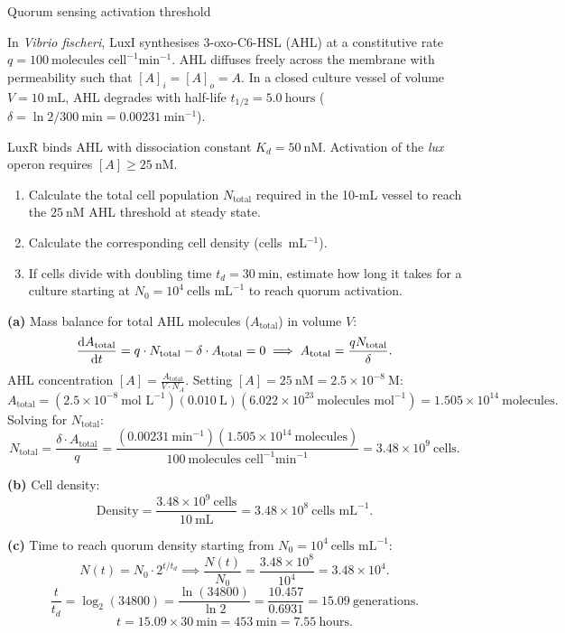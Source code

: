 \documentclass[12pt, a4paper, oneside]{report}
\begin{document}
\begin{problem}{\enspace{}\enspace
  Quorum sensing activation threshold}

  In \textit{Vibrio fischeri}, LuxI synthesises 3-oxo-C6-HSL (AHL) at a constitutive rate $q = 100~\text{molecules~cell}^{-1}\text{min}^{-1}$. AHL diffuses freely across the membrane with permeability such that $[A]_i = [A]_o = A$. In a closed culture vessel of volume $V = 10~\text{mL}$, AHL degrades with half-life $t_{1/2} = 5.0~\text{hours}$ ($\delta = \ln 2 / 300~\text{min} = 0.00231~\text{min}^{-1}$).

  LuxR binds AHL with dissociation constant $K_d = 50~\text{nM}$. Activation of the \textit{lux} operon requires $[A] \geq 25~\text{nM}$.

  \begin{enumerate}
    \item Calculate the total cell population $N_{\text{total}}$ required in the 10-mL vessel to reach the $25~\text{nM}$ AHL threshold at steady state.
    \item Calculate the corresponding cell density (cells~mL$^{-1}$).
    \item If cells divide with doubling time $t_d = 30~\text{min}$, estimate how long it takes for a culture starting at $N_0 = 10^4~\text{cells~mL}^{-1}$ to reach quorum activation.
  \end{enumerate}
\end{problem}

\begin{solution}
  \textbf{(a)} Mass balance for total AHL molecules ($A_{\text{total}}$) in volume $V$:
  \[
    \frac{\mathrm{d}A_{\text{total}}}{\mathrm{d}t} = q \cdot N_{\text{total}} - \delta \cdot A_{\text{total}} = 0 \implies A_{\text{total}} = \frac{q N_{\text{total}}}{\delta}.
  \]
  AHL concentration $[A] = \frac{A_{\text{total}}}{V \cdot N_A}$. Setting $[A] = 25~\text{nM} = 2.5 \times 10^{-8}~\text{M}$:
  \[
    A_{\text{total}} = (2.5 \times 10^{-8}~\text{mol~L}^{-1})(0.010~\text{L})(6.022 \times 10^{23}~\text{molecules~mol}^{-1}) = 1.505 \times 10^{14}~\text{molecules}.
  \]
  Solving for $N_{\text{total}}$:
  \[
    N_{\text{total}} = \frac{\delta \cdot A_{\text{total}}}{q} = \frac{(0.00231~\text{min}^{-1})(1.505 \times 10^{14}~\text{molecules})}{100~\text{molecules~cell}^{-1}\text{min}^{-1}} = 3.48 \times 10^{9}~\text{cells}.
  \]

  \textbf{(b)} Cell density:
  \[
    \text{Density} = \frac{3.48 \times 10^9~\text{cells}}{10~\text{mL}} = 3.48 \times 10^8~\text{cells~mL}^{-1}.
  \]

  \textbf{(c)} Time to reach quorum density starting from $N_0 = 10^4~\text{cells~mL}^{-1}$:
  \[
    N(t) = N_0 \cdot 2^{t / t_d} \implies \frac{N(t)}{N_0} = \frac{3.48 \times 10^8}{10^4} = 3.48 \times 10^4.
  \]
  \[
    \frac{t}{t_d} = \log_2(34800) = \frac{\ln(34800)}{\ln 2} = \frac{10.457}{0.6931} = 15.09~\text{generations}.
  \]
  \[
    t = 15.09 \times 30~\text{min} = 453~\text{min} = 7.55~\text{hours}.
  \]
\end{solution}
\end{document}
